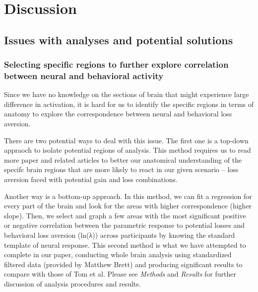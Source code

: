 \documentclass[11pt]{article}
\begin{document}
\newpage


\section{Discussion}

\subsection{Issues with analyses and potential solutions}

\subsubsection{Selecting specific regions to further explore 
correlation between neural and behavioral activity}

\indent Since we have no knowledge on the sections of brain that might 
experience large difference in activation, it is hard for us to identify the 
specific regions in terms of anatomy to explore the correspondence between neural 
and behavioral loss aversion.

There are two potential ways to deal with this issue. The first one is a 
top-down appraoch to isolate potential regions of analysis. This method 
requires us to read more paper and related articles to better our anatomical 
understanding of the specifc brain regions that are more likely to react in our 
given scenario -- loss aversion faced with potential gain and loss combinations.

Another way is a bottom-up approach. In this method, we can fit a regression for 
every part of the brain and look for the areas with higher correspondence 
(higher slope). Then, we select and graph a few areas with the most significant 
positive or negative correlation between the parametric response to potential 
losses and behavioral loss aversion (ln(λ)) across participants by knowing the 
standard template of neural response. This second method is what we have attempted 
to complete in our paper, conducting whole brain analysis using standardized 
filtered data (provided by Matthew Brett) and producing significant results to 
compare with those of Tom et al. Please see \textit{Methods} and \textit{Results} 
for further discussion of analysis procedures and results. 
\end{document}
